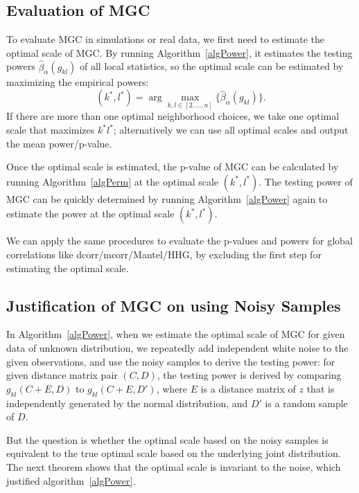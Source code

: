 \documentclass[11pt]{article}
\begin{document}
\subsection{Evaluation of MGC}
\label{appen:eval}

To evaluate MGC in simulations or real data, we first need to estimate the optimal scale of MGC. By running Algorithm~\ref{algPower}, it estimates the testing powers $\hat{\beta}_{\alpha}(g_{kl})$ of all local statistics, so the optimal scale can be estimated by maximizing the empirical powers:
\begin{equation}
\label{power}
(k^{*},l^{*})=\arg\max_{k,l \in [2,\ldots,n] }\{\hat{\beta}_{\alpha}(g_{kl})\}.
\end{equation}
If there are more than one optimal neighborhood choices, we take one optimal scale that maximizes $k^{*}l^{*}$; alternatively we can use all optimal scales and output the mean power/p-value. 

Once the optimal scale is estimated, the p-value of MGC can be calculated by running Algorithm~\ref{algPerm} at the optimal scale $(k^{*},l^{*})$. The testing power of MGC can be quickly determined by running Algorithm~\ref{algPower} again to estimate the power at the optimal scale $(k^{*},l^{*})$. 

We can apply the same procedures to evaluate the p-values and powers for global correlations like dcorr/mcorr/Mantel/HHG, by excluding the first step for estimating the optimal scale.

\subsection{Justification of MGC on using Noisy Samples}
\label{appen:justi}
In Algorithm~\ref{algPower}, when we estimate the optimal scale of MGC for given data of unknown distribution, we repeatedly add independent white noise to the given observations, and use the noisy samples to derive the testing power: for given distance matrix pair $(C,D)$, the testing power is derived by comparing $g_{kl}(C+E,D)$ to $g_{kl}(C+E,D')$, where $E$ is a distance matrix of $z$ that is independently generated by the normal distribution, and $D'$ is a random sample of $D$. 

But the question is whether the optimal scale based on the noisy samples is equivalent to the true optimal scale based on the underlying joint distribution. The next theorem shows that the optimal scale is invariant to the noise, which justified algorithm~\ref{algPower}.
\end{document}
